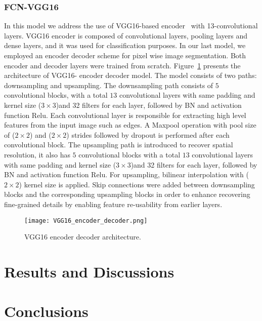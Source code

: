 \documentclass[preprint,9pt]{elsarticle}
\begin{document}
	\subsubsection{FCN-VGG16}
	In this model we address the use of VGG16-based encoder~\cite{Simonyan2015} with 13-convolutional layers.
	VGG16 encoder is composed of convolutional layers, pooling layers and dense layers, and it was used for classification purposes. 
	In our last model, we employed an encoder decoder scheme for pixel wise image segmentation. 
	Both encoder and decoder layers were trained from scratch.
	Figure~\ref{vgg16} presents the architecture of VGG16- encoder decoder model. 
	The model consists of two paths: downsampling and upsampling.
	The downsampling path consists of \(5\) convolutional blocks,  with a total \(13\) convolutional layers  with same padding and kernel size (\(3\times3\))and 32 filters for each layer, followed by BN and activation function Relu.
	Each convolutional layer is responsible for extracting high level features from the input image such as edges.
	A Maxpool operation with pool size of (\(2\times2\))  and (\(2\times2\)) strides followed by dropout is performed after each convolutional block. 
	The upsampling path is introduced to recover spatial resolution, it also has \(5\) convolutional blocks with a total \(13\) convolutional layers  with same padding and kernel size (\(3\times3\))and 32 filters for each layer, followed by BN and activation function Relu.
	For upsampling, bilinear interpolation with (\(2\times2\)) kernel size is applied.
	Skip connections were added between downsampling blocks and the corresponding upsampling blocks in order to enhance recovering fine-grained details by enabling feature re-usability from earlier layers.
	\begin{figure} [h!]
		\begin{center}
			\texttt{[image: VGG16\_encoder\_decoder.png]}
		\end{center}
		\caption{VGG16 encoder decoder architecture.} 
		\label{vgg16}
	\end{figure}

	\section{Results and Discussions}
	

	\section{Conclusions}



	\section*{}

	
	\section*{ }
	{}
	
	
	
\end{document}
